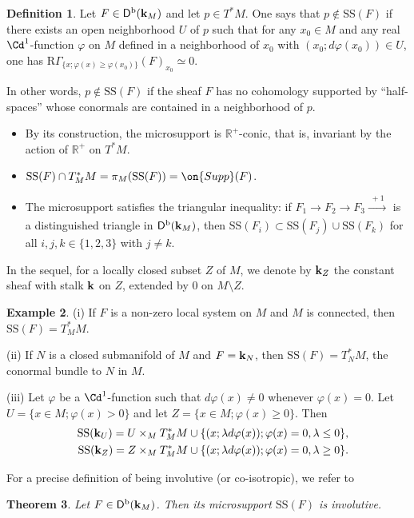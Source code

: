 \documentclass[12pt,leqno]{article}
\newtheorem{theorem}{Theorem}[section]
\theoremstyle{definition}
\newtheorem{definition}[theorem]{Definition}
\newtheorem{example}[theorem]{Example}
\newcommand{\R}{{\mathbb{R}}}
\def\phi{{\varphi}}
\newcommand{\cor}{{\bf k}}
\renewcommand{\to}[1][]{\xrightarrow[]{#1}}
\newcommand{\rsect}{\mathrm{R}\Gamma}
\newcommand{\eqn}{\begin{eqnarray*}}
\newcommand{\eneqn}{\end{eqnarray*}}
\newcommand{\Supp}{\on{Supp}}
\newcommand{\Der}[1][]{\mathsf{D}^{#1}}
\newcommand{\Derb}{\Der[\mathrm{b}]}
\newcommand{\SSi}{\mathrm{SS}}
\numberwithin{equation}{section}
\begin{document}
\begin{definition}
Let $F\in \Derb(\cor_M)$ and let $p\in T^*M$. 
One says that $p\notin\SSi(F)$ if there exists an open neighborhood
$U$ of $p$ such that for any $x_0\in M$ and any
real $\Cd^1$-function $\phi$ on $M$ defined in a neighborhood of $x_0$ 
with $(x_0;d\phi(x_0))\in U$, one has
$\rsect_{\{x;\phi(x)\geq\phi(x_0)\}} (F)_{x_0}\simeq0$.
\end{definition}
In other words, $p\notin\SSi(F)$ if the sheaf $F$ has no cohomology 
supported by ``half-spaces'' whose conormals are contained in a 
neighborhood of $p$. 
\begin{itemize}
\item
By its construction, the microsupport is $\R^+$-conic, that is,
invariant by the action of  $\R^+$ on $T^*M$. 
\item
$\SSi(F)\cap T^*_MM=\pi_M(\SSi(F))=\Supp(F)$.
\item
The microsupport satisfies the triangular inequality:
if $F_1\to F_2\to F_3\to[{\;+1\;}]$ is a
distinguished triangle in  $\Derb(\cor_M)$, then 
$\SSi(F_i)\subset\SSi(F_j)\cup\SSi(F_k)$ for all $i,j,k\in\{1,2,3\}$
with $j\not=k$. 
\end{itemize}
In the sequel, for a locally closed subset $Z$ of $M$, we denote by
$\cor_Z$ the constant sheaf with stalk $\cor$ on $Z$, extended by $0$
on $M\setminus Z$.

\begin{example}\label{ex:microsupp}
(i) If $F$ is a non-zero local system on $M$ and $M$ is connected, then $\SSi(F)=T^*_MM$.

\noindent
(ii) If $N$ is a closed submanifold of $M$ and $F=\cor_N$, then 
$\SSi(F)=T^*_NM$, the conormal bundle to $N$ in $M$.

\noindent
(iii) Let $\phi$ be a $\Cd^1$-function such that $d\phi(x)\not=0$ 
whenever $\phi(x)=0$.
Let $U=\{x\in M;\phi(x)>0\}$ and let $Z=\{x\in M;\phi(x)\geq0\}$. 
Then 
\eqn
&&\SSi(\cor_U)=U\times_MT^*_MM\cup\{(x;\lambda d\phi(x));\phi(x)=0,\lambda\leq0\},\\
&&\SSi(\cor_Z)=Z\times_MT^*_MM\cup\{(x;\lambda d\phi(x));\phi(x)=0,\lambda\geq0\}.
\eneqn
\end{example}
For a precise definition of being involutive (or co-isotropic),
we refer to~\cite[Def.~6.5.1]{KS90}
\begin{theorem}
Let $F\in \Derb(\cor_M)$. Then its microsupport 
$\SSi(F)$ is involutive.
\end{theorem} 
\end{document}
